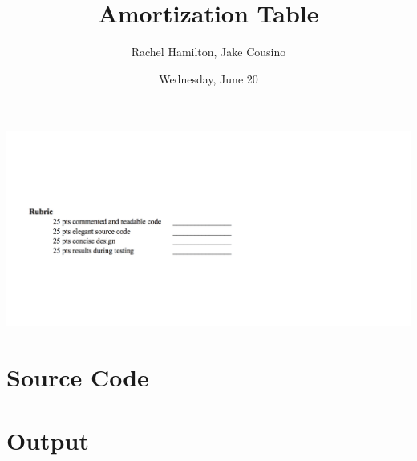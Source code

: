 \documentclass[10pt]{article}
\author{Rachel Hamilton, Jake Cousino}
\title{Amortization Table}
\date{Wednesday, June 20}
\begin{document}
\maketitle
\tableofcontents
\vskip20mm
\includegraphics[width=\textwidth]{rubric.png}
\pagebreak
\part{Source Code}

\pagebreak
\part{Output}
\begin{alltt}
\footnotesize

\end{alltt}
\end{document}

